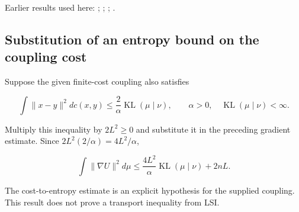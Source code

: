 \documentclass[11pt,a4paper]{report}
\begin{document}
Earlier results used here: \cite[Section~3.17.1]{LangevinLean2026ULASC}; \cite[Section~3.26.3]{LangevinLean2026ULASC}; \cite[Section~3.27.6]{LangevinLean2026ULASC}; \cite[Section~3.27.7]{LangevinLean2026ULASC}.
\subsection{\texorpdfstring{Substitution of an entropy bound on the coupling cost}{Substitution of an entropy bound on the coupling cost}}
\label{report-step-UnadjustedLangevin-LSI-GradientMoment-lean-3}


Suppose the given finite-cost coupling also satisfies

\[\int\|x-y\|^2dc(x,y)\le\frac2\alpha\operatorname{KL}(\mu\mid\nu),\qquad \alpha>0,\quad \operatorname{KL}(\mu\mid\nu)<\infty.\]

Multiply this inequality by \(2L^2\ge0\) and substitute it in the preceding gradient estimate. Since \(2L^2(2/\alpha)=4L^2/\alpha\),

\[\int\|\nabla U\|^2d\mu\le\frac{4L^2}{\alpha}\operatorname{KL}(\mu\mid\nu)+2nL.\]

The cost-to-entropy estimate is an explicit hypothesis for the supplied coupling. This result does not prove a transport inequality from LSI.
\end{document}
